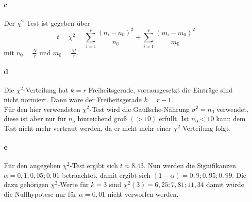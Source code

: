 \paragraph{c}
Der $\chi^2$-Test ist gegeben über
\begin{equation}
 t = \chi^2 = \sum_{i=1}^r \frac{(n_i-n_0)^2}{n_0}+\sum_{i=1}^r \frac{(m_i-m_0)^2}{m_0} 
\end{equation}
mit $n_0 = \frac{N}{r}$ und $m_0 = \frac{M}{r}$.

\paragraph{d} 
Die $\chi^2$-Verteilung hat $k=r$ Freiheitsgerade, vorrausgesetzt die Einträge sind nicht normiert. 
Dann wäre der Freiheitsgerade $k= r-1$.\\
Für den hier verwendeten $\chi^2$-Test wird die Gaußsche-Nährung $\sigma^2 = n_0$ verwendet, diese 
ist aber nur für $n_o$ hinreichend groß $(>10)$ erfüllt. Ist $n_0 < 10$ kann dem Test nicht mehr vertraut 
werden, da er nicht mehr einer $\chi^2$-Verteilung folgt.
\paragraph{e}
Für den angegeben $\chi^2$-Test ergibt sich $t\approx 8.43$.
Nun werden die Signifikanzen $\alpha = 0,1 ; 0,05 ; 0,01$ betraachtet, damit ergibt sich 
$(1-\alpha) = 0,9 ; 0,95 ; 0,99$. Die dazu gehörigen $\chi^2$-Werte für $k = 3$ sind 
$\chi^2(3) = 6,25;7,81;	11,34$ damit würde die Nullhypotese nur für $\alpha=0,01$ nicht verworfen werden. 

